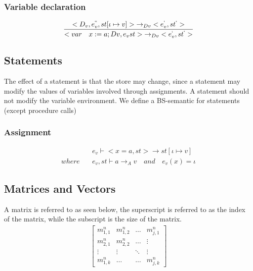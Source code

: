 \subsubsection{Variable declaration}
\begin{equation}
	\frac { <{ D }_{ v },{ e }_{ v }^{ `` },st[\iota \mapsto v]>{ \rightarrow  }_{ Dv }<{ e }_{ v }^{ ` },{ st }^{ ` }> }{ <var\quad x:=a;Dv,{ e }_{ v }st>{ \rightarrow  }_{ Dv }<{ e }_{ v }^{ ` },{ st }^{ ` }> }
\end{equation}

\subsection*{Statements}
The effect of a statement is that the store may change, since a statement may modify the values of variables involved through assignments.
A statement should not modify the variable environment.
We define a BS-semantic for statements (except procedure calls)

\subsubsection{Assignment}
\begin{align*}
	&{ e }_{ v }\vdash <x=a,st>\rightarrow st[\iota \mapsto v]\\
	where\quad &{ e }_{ v },st\vdash a{ \rightarrow  }_{ A }v\quad and\quad  { e }_{ v }(x)=\iota 
\end{align*}

\subsection*{Matrices and Vectors}
A matrix is referred to as seen below, the superscript is referred to as the index of the matrix, while the subscript is the size of the matrix.
\begin{align*}
	\begin{bmatrix} { { m }_{ 1,1 }^{ n } } & { { m }_{ 1,2 }^{ n } } & \dots  & { m }_{ j,1 }^{ n } \\
{ { m }_{ 2,1 }^{ n } }  &  { { m }_{ 2,2 }^{ n } } & \dots & \vdots
\\ \vdots  & \vdots & \ddots  & \vdots \\
 { m }_{ 1,k }^{ n } & \dots & \dots & { m }_{ j,k }^{ n } \end{bmatrix}
\end{align*}

